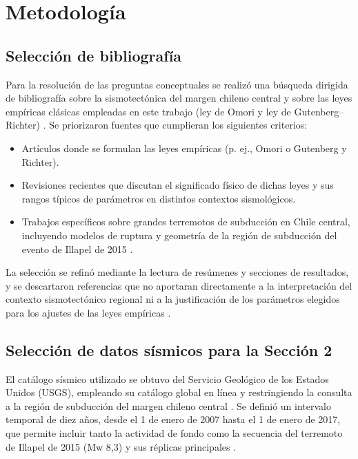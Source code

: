 \documentclass[a4paper,12pt]{article} %
\numberwithin{equation}{section} %
\numberwithin{figure}{section} %
\begin{document}
\section{Metodología}

\subsection{Selección de bibliografía}

Para la resolución de las preguntas conceptuales se realizó una búsqueda dirigida de bibliografía sobre la sismotectónica del margen chileno central y sobre las leyes empíricas clásicas empleadas en este trabajo (ley de Omori y ley de Gutenberg--Richter) \cite{utsu_1995,guglielmi_2017,gutenberg_richter_1944}. Se priorizaron fuentes que cumplieran los siguientes criterios:

\begin{itemize}
    \item Artículos donde se formulan las leyes empíricas (p. ej., Omori o Gutenberg y Richter).
    \item Revisiones recientes que discutan el significado físico de dichas leyes y sus rangos típicos de parámetros en distintos contextos sismológicos.
    \item Trabajos específicos sobre grandes terremotos de subducción en Chile central, incluyendo modelos de ruptura y geometría de la región de subducción del evento de Illapel de 2015 \cite{fernandez_2018, slip_illapel_2015}.
\end{itemize}

La selección se refinó mediante la lectura de resúmenes y secciones de resultados, y se descartaron referencias que no aportaran directamente a la interpretación del contexto sismotectónico regional ni a la justificación de los parámetros elegidos para los ajustes de las leyes empíricas \cite{utsu_1995,guglielmi_2017}.

\subsection{Selección de datos sísmicos para la Sección 2}

El catálogo sísmico utilizado se obtuvo del Servicio Geológico de los Estados Unidos (USGS), empleando su catálogo global en línea y restringiendo la consulta a la región de subducción del margen chileno central \cite{usgs_catalog}. Se definió un intervalo temporal de diez años, desde el 1 de enero de 2007 hasta el 1 de enero de 2017, que permite incluir tanto la actividad de fondo como la secuencia del terremoto de Illapel de 2015 (Mw 8{,}3) y sus réplicas principales \cite{fernandez_2018,slip_illapel_2015}.
\end{document}

